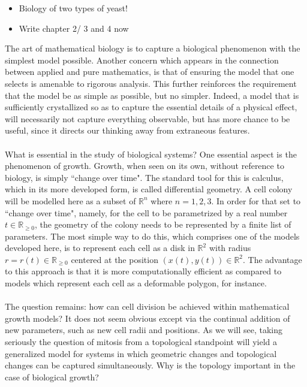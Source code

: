 \introduction

\begin{itemize}
    \item Biology of two types of yeast!
    \item Write chapter 2/ 3 and 4 now 
\end{itemize}
The art of mathematical biology is to capture a biological phenomenon with the simplest model possible. Another concern which appears in the connection between applied and pure mathematics, is that of ensuring the model that one selects is amenable to rigorous analysis. This further reinforces the requirement that the model be as simple as possible, but no simpler. Indeed, a model that is sufficiently crystallized so as to capture the essential details of a physical effect, will necessarily not capture everything observable, but has more chance to be useful, since it directs our thinking away from extraneous features.
\\
\\
What is essential in the study of biological systems? One essential aspect is the phenomenon of growth. Growth, when seen on its own, without reference to biology, is simply ``change over time". The standard tool for this is calculus, which in its more developed form, is called differential geometry. A cell colony will be modelled here as a subset of $\mathbb{R}^n$ where $n = 1,2,3$. In order for that set to ``change over time", namely, for the cell to be parametrized by a real number $t \in \mathbb{R}_{\geq 0}$, the geometry of the colony needs to be represented by a finite list of parameters. The most simple way to do this, which comprises one of the models developed here, is to represent each cell as a disk in $\mathbb{R}^2$ with radius $r = r(t) \in \mathbb{R}_{\geq 0}$ centered at the position $(x(t),y(t)) \in \mathbb{R}^2$. The advantage to this approach is that it is more computationally efficient as compared to models which represent each cell as a deformable polygon, for instance.
\\
\\
The question remains: how can cell division be achieved within mathematical growth models? It does not seem obvious except via the continual addition of new parameters, such as new cell radii and positions. As we will see, taking seriously the question of mitosis from a topological standpoint will yield a generalized model for systems in which geometric changes and topological changes can be captured simultaneously. Why is the topology important in the case of biological growth? 
